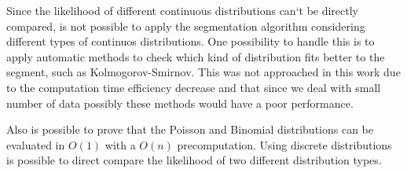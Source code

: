 Since the likelihood of different continuous distributions can`t be directly compared, is not possible to apply the segmentation algorithm considering different types of continuos distributions. One possibility to handle this is to apply automatic methods to check which kind of distribution fits better to the segment, such as Kolmogorov-Smirnov. This was not approached in this work due to the computation time efficiency decrease and that since we deal with small number of data possibly these methods would have a poor performance.

Also is possible to prove that the Poisson and Binomial distributions can be evaluated in $O(1)$ with a $O(n)$ precomputation. Using discrete distributions is possible to direct compare the likelihood of two different distribution types. 

%
%
%
%
%
%
%
%
%

